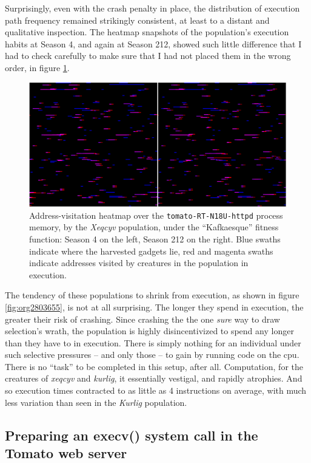 \documentclass[12pt,glossary]{dalthesis}
\begin{document}
Surprisingly, even with the crash penalty in place, the distribution of execution
path frequency remained strikingly consistent, at least to a distant and qualitative
inspection. The heatmap snapshots of the population's execution habits at Season 4,
and again at Season 212, showed such little difference that I had to check carefully
to make sure that I had not placed them in the wrong order, in figure
\ref{fig:org09a4cd9}. 

\begin{figure}[htbp]
\centering
\includegraphics[width=.9\linewidth]{../images/plots/xeqcyv_kafka_heatmap_beginning_end.pdf}
\caption{\label{fig:org09a4cd9}
Address-visitation heatmap over the \texttt{tomato-RT-N18U-httpd} process memory, by the \emph{Xeqcyv} population, under the ``Kafkaesque'' fitness function: Season 4 on the left, Season 212 on the right. Blue swaths indicate where the harvested gadgets lie, red and magenta swaths indicate addresses visited by creatures in the population in execution.}
\end{figure}


The tendency of these populations to shrink from execution, as shown in figure
\ref{fig:org2803655}, is not at all surprising. The longer they spend in
execution, the greater their risk of crashing. Since crashing the the one \emph{sure}
way to draw selection's wrath, the population is highly disincentivized to spend
any longer than they have to in execution. There is simply nothing for an
individual under such selective pressures -- and only those -- to gain by
running code on the \gls{cpu}. There is no ``task'' to be completed in this setup,
after all. Computation, for the creatures of \emph{xeqcyv} and \emph{kurlig}, it essentially
vestigal, and rapidly atrophies. And so execution times contracted to as little
as 4 instructions on average, with much less variation than seen in the
\emph{Kurlig} population.

\subsection{Preparing an execv() system call in the Tomato web server}
\label{sec:orgf1208a0}
\label{orgc143ed8}
\end{document}
